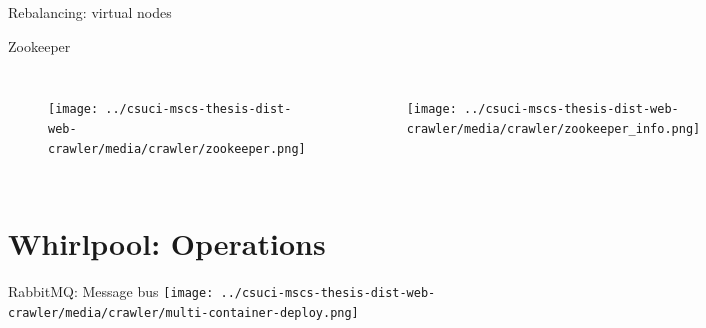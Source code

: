 \documentclass[9pt]{beamer}
\begin{document}

\begin{frame}{Rebalancing: virtual nodes}
\end{frame}


\begin{frame}{Zookeeper}
  \begin{columns}[t]
    \begin{figure}
     \centering \texttt{[image: ../csuci-mscs-thesis-dist-web-crawler/media/crawler/zookeeper.png]}
   \end{figure}
   \begin{figure}
     \centering
     \texttt{[image: ../csuci-mscs-thesis-dist-web-crawler/media/crawler/zookeeper\_info.png]}
   \end{figure}
 \end{columns}
\end{frame}


\section[opswork]{Whirlpool: Operations}
\begin{frame}[plain]
\end{frame}


\begin{frame}{RabbitMQ: Message bus}
  \centering
  \texttt{[image: ../csuci-mscs-thesis-dist-web-crawler/media/crawler/multi-container-deploy.png]}
\end{frame}
\end{document}
